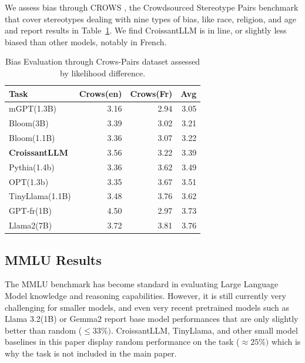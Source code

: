 We assess bias through CROWS , the Crowdsourced Stereotype Pairs benchmark that cover stereotypes dealing with nine types of bias, like race, religion, and age and report results in Table~\ref{tab:bias}. We find CroissantLLM is in line, or slightly less biased than other models, notably in French. 

\begin{table}
    \centering
\begin{tabular}{lrrr}
\toprule
    Task & Crows(en) & Crows(Fr) & Avg \\
    \midrule
    mGPT(1.3B) & 3.16 & 2.94 & 3.05 \\
    Bloom(3B) & 3.39 & 3.02 & 3.21 \\
    Bloom(1.1B) & 3.36 & 3.07 & 3.22 \\
    \textbf{CroissantLLM} & 3.56 & 3.22 & 3.39 \\
    Pythia(1.4b) & 3.36 & 3.62 & 3.49 \\
    OPT(1.3b) & 3.35 & 3.67 & 3.51 \\
    TinyLlama(1.1B) & 3.48 & 3.76 & 3.62 \\
    GPT-fr(1B) & 4.50 & 2.97 & 3.73 \\
    Llama2(7B) & 3.72 & 3.81 & 3.76 \\
    \bottomrule
    \end{tabular}

    \caption[Bias evaluation on Crows-Pairs]{Bias Evaluation through Crows-Pairs dataset assessed by likelihood difference.}
    \label{tab:bias}
\end{table}

\subsection{MMLU Results}

The MMLU benchmark  has become standard in evaluating Large Language Model knowledge and reasoning capabilities. However, it is still currently very challenging for smaller models, and even very recent pretrained models such as Llama 3.2(1B) or Gemma2  report base model performances that are only slightly better than random ($\leq 33\%)$. CroissantLLM, TinyLlama, and other small model baselines in this paper display random performance on the task ($\approx 25\%)$ which is why the task is not included in the main paper.
